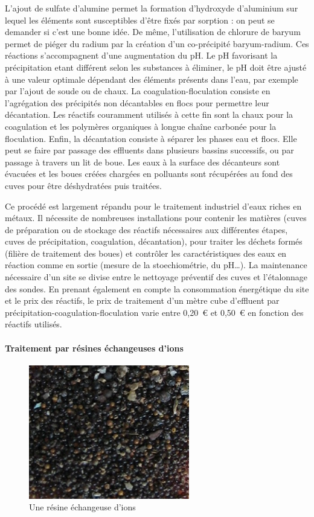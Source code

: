 \documentclass{article}
\begin{document}
L’ajout de sulfate d’alumine permet la formation d’hydroxyde d’aluminium sur lequel les éléments sont susceptibles d'être fixés par sorption : on peut se demander si c'est une bonne idée. De même, l’utilisation de chlorure de baryum permet de piéger du radium par la création d’un co-précipité baryum-radium. Ces réactions s’accompagnent d’une augmentation du pH. Le pH favorisant la précipitation etant différent selon les substances à éliminer, le pH doit être ajusté à une valeur optimale dépendant des éléments présents dans l'eau, par exemple par l’ajout de soude ou de chaux. La coagulation-floculation consiste en l’agrégation des précipités non décantables en flocs  pour permettre leur décantation. Les réactifs couramment utilisés à cette fin sont la chaux pour la coagulation et les polymères organiques à longue chaîne carbonée pour la floculation. Enfin, la décantation consiste à séparer les phases eau et flocs. Elle peut se faire par passage des effluents dans plusieurs bassins successifs, ou par passage à travers un lit de boue. Les eaux à la surface des décanteurs sont évacuées et les boues créées chargées en polluants sont récupérées au fond des cuves pour être déshydratées puis traitées.

Ce procédé est largement répandu pour le traitement industriel d’eaux riches en métaux. Il nécessite de nombreuses installations pour contenir les matières (cuves de préparation ou de stockage des réactifs nécessaires aux différentes étapes, cuves de précipitation, coagulation, décantation), pour traiter les déchets formés (filière de traitement des boues) et contrôler les caractéristiques des eaux en réaction comme en sortie (mesure de la stoechiométrie, du pH…). La maintenance nécessaire d'un site se divise entre le nettoyage préventif des cuves et l'étalonnage des sondes. En prenant également en compte la consommation énergétique du site et le prix des réactifs, le prix de traitement d’un mètre cube d’effluent par précipitation-coagulation-floculation varie entre 0,20~\euro{} et 0,50~\euro{} en fonction des réactifs utilisés.

\paragraph{Traitement par résines échangeuses d’ions} \hspace{1 em}


\begin{figure}[H]
\centering
\includegraphics[]{III_A_2.png}
\caption{Une résine échangeuse d'ions}
\label{fig:resine_echangeuse_ions}
\end{figure}
\end{document}
